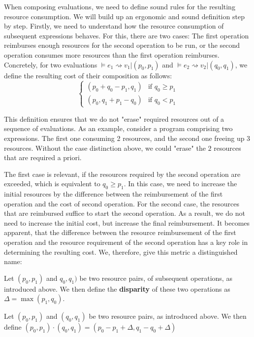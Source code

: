 When composing evaluations, we need to define sound rules for the resulting resource consumption. We will build up an ergonomic and sound definition step by step. Firstly, we need to understand how the resource consumption of subsequent expressions behaves. For this, there are two cases: The first operation reimburses enough resources for the second operation to be run, or the second operation consumes more resources than the first operation reimburses. Concretely, for two evaluations \( \vDash e_1 \rightsquigarrow v_1 | (p_0, p_1)\) and \( \vDash e_2 \rightsquigarrow v_2 | (q_0, q_1)\), we define the resulting cost of their composition as follows:
\[
   \begin{cases}
      (p_0 + q_0 - p_1, q_1) & \mbox{if } q_0 \geq p_1 \\
      (p_0, q_1 + p_1 - q_0) & \mbox{if } q_0 <    p_1
   \end{cases}
\]

This definition ensures that we do not "erase" required resources out of a sequence of evaluations. As an example, consider a program comprising two expressions. The first one consuming 2 resources, and the second one freeing up 3 resources. Without the case distinction above, we could "erase" the \(2\) resources that are required a priori. 

The first case is relevant, if the resources required by the second operation are exceeded, which is equivalent to \(q_0 \geq p_1\). In this case, we need to increase the initial resources by the difference between the reimbursement of the first operation and the cost of second operation. For the second case, the resources that are reimbursed suffice to start the second operation. As a result, we do not need to increase the initial cost, but increase the final reimbursement. It becomes apparent, that the difference between the resource reimbursement of the first operation and the resource requirement of the second operation has a key role in determining the resulting cost. We, therefore, give this metric a distinguished name:

\begin{definition}
   Let \((p_0, p_1)\) and \(q_0, q_1)\) be two resource pairs, of subsequent operations, as introduced above. We then define the \textbf{disparity} of these two operations as \(\Delta = \max(p_1, q_0)\).
\end{definition}


\begin{definition}

   Let \((p_0, p_1)\) and \((q_0, q_1)\) be two resource pairs, as introduced above. We then define 
   \((p_0, p_1) \cdot (q_0, q_1) = (p_0 - p_1 + \Delta, q_1 - q_0 + \Delta)\)
   
\end{definition}


